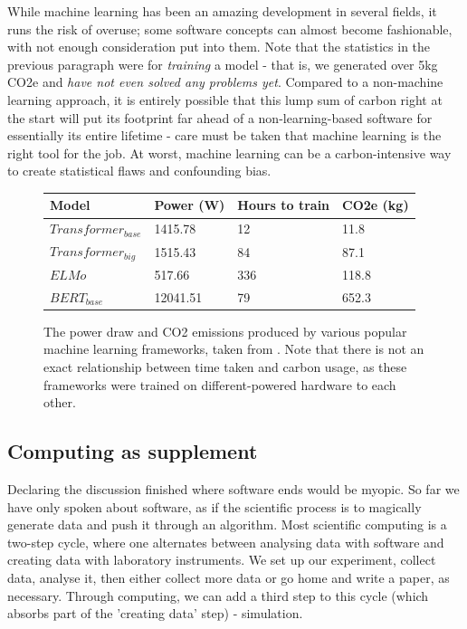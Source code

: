 \documentclass{article}
\begin{document}
While machine learning has been an amazing development in several fields, it runs the risk of overuse; some software concepts can almost become fashionable, with not enough consideration put into them. Note that the statistics in the previous paragraph were for \emph{training} a model - that is, we generated over 5kg CO2e and \emph{have not even solved any problems yet}. Compared to a non-machine learning approach, it is entirely possible that this lump sum of carbon right at the start will put its footprint far ahead of a non-learning-based software for essentially its entire lifetime - care must be taken that machine learning is the right tool for the job. At worst, machine learning can be a carbon-intensive way to create statistical flaws and confounding bias. \citep{mania2019model}

\begin{figure}[!ht]
\begin{center}
\begin{tabular}{l l l l}
  Model & Power (W) & Hours to train & CO2e (kg) \\
  \hline\hline
  $Transformer_{base}$ & 1415.78 & 12 & 11.8 \\
  $Transformer_{big}$ & 1515.43 & 84 & 87.1 \\
  $ELMo$ & 517.66 & 336 & 118.8 \\
  $BERT_{base}$ & 12041.51 & 79 & 652.3
\end{tabular}
\caption{The power draw and CO2 emissions produced by various popular machine learning frameworks, taken from \citet{strubell2019energy}. Note that there is not an exact relationship between time taken and carbon usage, as these frameworks were trained on different-powered hardware to each other.}
\end{center}
\end{figure}


\subsection{Computing as supplement}
Declaring the discussion finished where software ends would be myopic. So far we have only spoken about software, as if the scientific process is to magically generate data and push it through an algorithm. Most scientific computing is a two-step cycle, where one alternates between analysing data with software and creating data with laboratory instruments. We set up our experiment, collect data, analyse it, then either collect more data or go home and write a paper, as necessary. Through computing, we can add a third step to this cycle (which absorbs part of the 'creating data' step) - simulation. \newline
\end{document}

